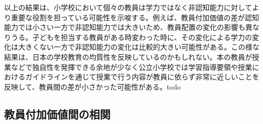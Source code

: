 \documentclass[a4paper,12pt]{article}
\begin{document}
以上の結果は、小学校において個々の教員は学力ではなく非認知能力に対してより重要な役割を担っている可能性を示唆する。例えば、教員付加価値の差が認知能力では小さい一方で非認知能力では大きいため、教員配置の変化の影響も異なりうる。子どもを担当する教員がある時変わった時に、その変化による学力の変化は大きくない一方で非認知能力の変化は比較的大きい可能性がある。この様な結果は、日本の学校教育の均質性を反映しているのかもしれない。本の教員が授業などで独自性を発揮できる余地が少なく公立小学校では学習指導要領や授業におけるガイドラインを通じて授業で行う内容が教員に依らず非常に近しいことを反映して、教員間の差が小さかった可能性がある。todo


\subsection{教員付加価値間の相関}

\end{document}
